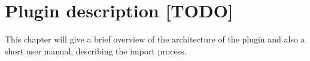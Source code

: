 \chapter{Plugin description [TODO]}

This chapter will give a brief overview of the architecture of the plugin and also a short user manual, describing the import process.